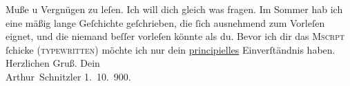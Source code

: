 \begin{ledgroupsized}[t]{13cm}
               Muße u Vergnügen zu leſen. Ich will dich gleich was fragen. Im Sommer hab ich eine
               mäßig {\pb}lange Geſchichte geſchrieben, die
               ſich ausnehmend zum Vorleſen eignet, und die niemand beſſer vorleſen könnte als du.
               Bevor ich dir das \textsc{Mscrpt}{ }ſchicke (\textsc{typewritten})
               möchte ich nur dein \uline{principielles} Einverſtändnis
               haben. Herzlichen Gruß. Dein{\\}\spacefill\mbox{Arthur Schnitzler}\pend
           \pstart
           1. 10. 900.\pend
           
         
         \endnumbering{}\end{ledgroupsized}  \newcommand{\dateiname}{L01076}\newcommand{\titel}{Arthur Schnitzler an Hermann Bahr, 11. 10. 1900}\newcommand{\editorInnen}{ Kurt Ifkovits,  Martin Anton Müller}
      
